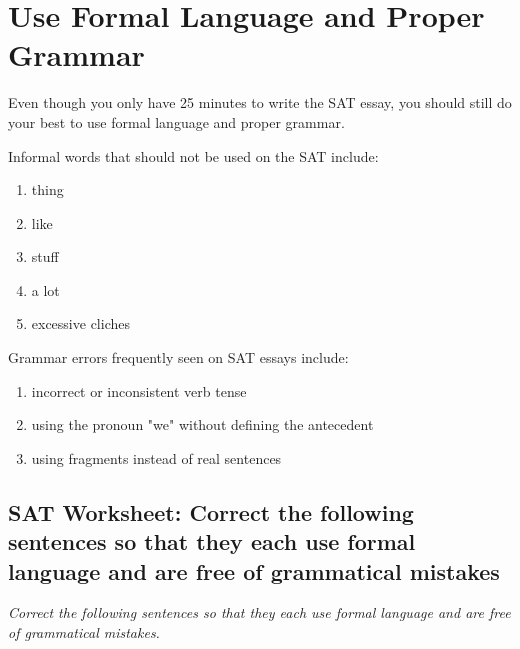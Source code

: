 \section{Use Formal Language and Proper Grammar}

Even though you only have 25 minutes to write the SAT essay, you should still do your best to
use formal language and proper grammar.

Informal words that should not be used on the SAT include:
\begin{enumerate}
\item thing
\item like
\item stuff
\item a lot
\item excessive cliches
\end{enumerate}

Grammar errors frequently seen on SAT essays include:
\begin{enumerate}
\item incorrect or inconsistent verb tense
\item using the pronoun "we" without defining the antecedent
\item using fragments instead of real sentences
\end{enumerate}

\subsection{SAT Worksheet: Correct the following sentences so that they each use formal language and are free of grammatical mistakes}
\textit{Correct the following sentences so that they each use formal language and are free of grammatical mistakes.}

